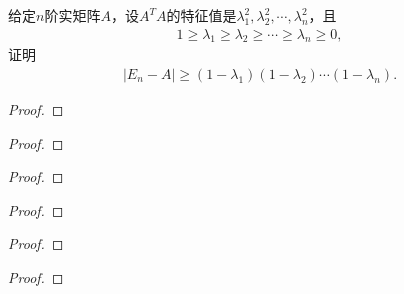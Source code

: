 \documentclass[../../main.tex]{subfiles}
\begin{document}
\begin{example}
给定$n$阶实矩阵$A$，设$A^T A$的特征值是$\lambda_1^2,\lambda_2^2,\cdots,\lambda_n^2$，且
\begin{align*}
1 \geqslant \lambda_1 \geqslant \lambda_2 \geqslant \cdots \geqslant \lambda_n \geqslant 0,
\end{align*}
证明
\begin{align*}
|E_n - A| \geqslant (1 - \lambda_1)(1 - \lambda_2)\cdots(1 - \lambda_n).
\end{align*}
\end{example}
\begin{proof}


\end{proof}

\begin{example}

\end{example}
\begin{proof}


\end{proof}

\begin{example}

\end{example}
\begin{proof}


\end{proof}

\begin{example}

\end{example}
\begin{proof}


\end{proof}

\begin{example}

\end{example}
\begin{proof}


\end{proof}

\begin{example}

\end{example}
\begin{proof}


\end{proof}
\end{document}
